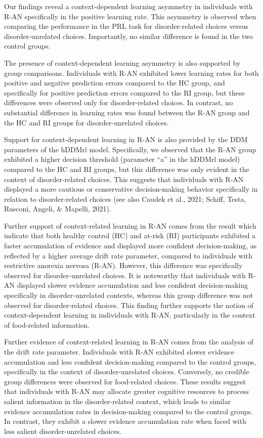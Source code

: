 \documentclass[
  man,floatsintext]{apa6}
\begin{document}
Our findings reveal a context-dependent learning asymmetry in individuals with R-AN specifically in the positive learning rate. This asymmetry is observed when comparing the performance in the PRL task for disorder-related choices versus disorder-unrelated choices. Importantly, no similar difference is found in the two control groups.

The presence of context-dependent learning asymmetry is also supported by group comparisons. Individuals with R-AN exhibited lower learning rates for both positive and negative prediction errors compared to the HC group, and specifically for positive prediction errors compared to the RI group, but these differences were observed only for disorder-related choices. In contrast, no substantial difference in learning rates was found between the R-AN group and the HC and RI groups for disorder-unrelated choices.

Support for context-dependent learning in R-AN is also provided by the DDM parameters of the hDDMrl model. Specifically, we observed that the R-AN group exhibited a higher decision threshold (parameter ``a'' in the hDDMrl model) compared to the HC and RI groups, but this difference was only evident in the context of disorder-related choices. This suggests that individuals with R-AN displayed a more cautious or conservative decision-making behavior specifically in relation to disorder-related choices (see also Caudek et al., 2021; Schiff, Testa, Rusconi, Angeli, \& Mapelli, 2021).

Further support of context-related learning in R-AN comes from the result which indicate that both healthy control (HC) and at-risk (RI) participants exhibited a faster accumulation of evidence and displayed more confident decision-making, as reflected by a higher average drift rate parameter, compared to individuals with restrictive anorexia nervosa (R-AN). However, this difference was specifically observed for disorder-unrelated choices. It is noteworthy that individuals with R-AN displayed slower evidence accumulation and less confident decision-making specifically in disorder-unrelated contexts, whereas this group difference was not observed for disorder-related choices. This finding further supports the notion of context-dependent learning in individuals with R-AN, particularly in the context of food-related information.

Further evidence of context-related learning in R-AN comes from the analysis of the drift rate parameter. Individuals with R-AN exhibited slower evidence accumulation and less confident decision-making compared to the control groups, specifically in the context of disorder-unrelated choices. Conversely, no credible group differences were observed for food-related choices. These results suggest that individuals with R-AN may allocate greater cognitive resources to process salient information in the disorder-related context, which leads to similar evidence accumulation rates in decision-making compared to the control groups. In contrast, they exhibit a slower evidence accumulation rate when faced with less salient disorder-unrelated choices.
\end{document}
